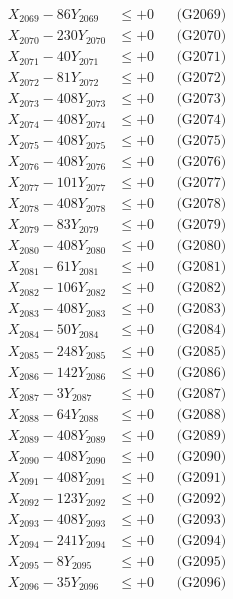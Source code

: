 \documentclass[a4paper,10pt]{article}
\begin{document}
{\begin{align}
X_{2069} - 86Y_{2069} &\leq +0 && \text{(G2069)} \\
X_{2070} - 230Y_{2070} &\leq +0 && \text{(G2070)} \\
\allowbreak
X_{2071} - 40Y_{2071} &\leq +0 && \text{(G2071)} \\
X_{2072} - 81Y_{2072} &\leq +0 && \text{(G2072)} \\
X_{2073} - 408Y_{2073} &\leq +0 && \text{(G2073)} \\
X_{2074} - 408Y_{2074} &\leq +0 && \text{(G2074)} \\
X_{2075} - 408Y_{2075} &\leq +0 && \text{(G2075)} \\
X_{2076} - 408Y_{2076} &\leq +0 && \text{(G2076)} \\
X_{2077} - 101Y_{2077} &\leq +0 && \text{(G2077)} \\
X_{2078} - 408Y_{2078} &\leq +0 && \text{(G2078)} \\
X_{2079} - 83Y_{2079} &\leq +0 && \text{(G2079)} \\
X_{2080} - 408Y_{2080} &\leq +0 && \text{(G2080)} \\
\allowbreak
X_{2081} - 61Y_{2081} &\leq +0 && \text{(G2081)} \\
X_{2082} - 106Y_{2082} &\leq +0 && \text{(G2082)} \\
X_{2083} - 408Y_{2083} &\leq +0 && \text{(G2083)} \\
X_{2084} - 50Y_{2084} &\leq +0 && \text{(G2084)} \\
X_{2085} - 248Y_{2085} &\leq +0 && \text{(G2085)} \\
X_{2086} - 142Y_{2086} &\leq +0 && \text{(G2086)} \\
X_{2087} - 3Y_{2087} &\leq +0 && \text{(G2087)} \\
X_{2088} - 64Y_{2088} &\leq +0 && \text{(G2088)} \\
X_{2089} - 408Y_{2089} &\leq +0 && \text{(G2089)} \\
X_{2090} - 408Y_{2090} &\leq +0 && \text{(G2090)} \\
\allowbreak
X_{2091} - 408Y_{2091} &\leq +0 && \text{(G2091)} \\
X_{2092} - 123Y_{2092} &\leq +0 && \text{(G2092)} \\
X_{2093} - 408Y_{2093} &\leq +0 && \text{(G2093)} \\
X_{2094} - 241Y_{2094} &\leq +0 && \text{(G2094)} \\
X_{2095} - 8Y_{2095} &\leq +0 && \text{(G2095)} \\
X_{2096} - 35Y_{2096} &\leq +0 && \text{(G2096)} \\

\end{align}}
\end{document}
